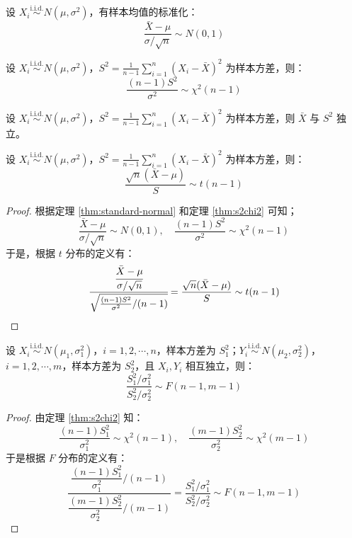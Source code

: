 \begin{theorem}
\label{thm:standard-normal}
设 $X_i\overset{\text{i.i.d.}}{\sim} N(\mu,\sigma^2)$，有样本均值的标准化：
\[
\frac{\bar X-\mu}{\sigma/\sqrt{n}}\sim N(0,1)
\]
\end{theorem}

\begin{theorem}
\label{thm:s2chi2}
设 $X_i\overset{\text{i.i.d.}}{\sim} N(\mu,\sigma^2)$，$S^2=\frac{1}{n-1}\sum\limits_{i=1}^n(X_i-\bar X)^2$ 为样本方差，则：
\[
\frac{(n-1)S^2}{\sigma^2}\sim \chi^2(n-1)
\]
\end{theorem}

\begin{theorem}
设 $X_i\overset{\text{i.i.d.}}{\sim} N(\mu,\sigma^2)$，$S^2=\frac{1}{n-1}\sum\limits_{i=1}^n(X_i-\bar X)^2$ 为样本方差，则 $\bar X$ 与 $S^2$ 独立。
\end{theorem}

\begin{theorem}
设 $X_i\overset{\text{i.i.d.}}{\sim} N(\mu,\sigma^2)$，$S^2=\frac{1}{n-1}\sum\limits_{i=1}^n(X_i-\bar X)^2$ 为样本方差，则：
\[
\frac{\sqrt n(\bar X-\mu)}{S}\sim t(n-1)
\]
\end{theorem}
\begin{proof}
根据定理 \ref{thm:standard-normal} 和定理 \ref{thm:s2chi2} 可知；
\[
\frac{\bar X-\mu}{\sigma/\sqrt{n}}\sim N(0,1),\quad
\frac{(n-1)S^2}{\sigma^2}\sim \chi^2(n-1)
\]
于是，根据 $t$ 分布的定义有：
\[
\cfrac{\cfrac{\bar X-\mu}{\sigma/\sqrt{n}}}{\sqrt{\frac{(n-1)S^2}{\sigma^2}/(n-1)}}=\frac{\sqrt n(\bar X-\mu)}{S}\sim t(n-1)
\]
\end{proof}

\begin{theorem}
设 $X_i\overset{\text{i.i.d.}}{\sim} N(\mu_1,\sigma_1^2)$，$i=1,2,\cdots,n$，样本方差为 $S_1^2$；$Y_i\overset{\text{i.i.d.}}{\sim} N(\mu_2,\sigma_2^2)$，$i=1,2,\cdots,m$，样本方差为 $S_2^2$，且 $X_i,Y_i$ 相互独立，则：
\[
\frac{S_1^2/\sigma_1^2}{S_2^2/\sigma_2^2}\sim F(n-1,m-1)
\]
\end{theorem}
\begin{proof}
由定理 \ref{thm:s2chi2} 知：
\[
\frac{(n-1)S_1^2}{\sigma_1^2}\sim\chi^2(n-1),\quad
\frac{(m-1)S_2^2}{\sigma_2^2}\sim \chi^2(m-1)
\]
于是根据 $F$ 分布的定义有：
\[
\frac{\dfrac{(n-1)S_1^2}{\sigma_1^2}/(n-1)}{\dfrac{(m-1)S_2^2}{\sigma_2^2}/(m-1)}=\frac{S_1^2/\sigma_1^2}{S_2^2/\sigma_2^2}\sim F(n-1,m-1)
\]
\end{proof}
